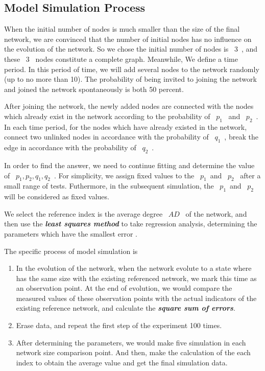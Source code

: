 \documentclass[a4paper,11pt]{article}
\begin{document}
\subsection{Model Simulation Process}
\par When the initial number of nodes is much smaller than the size of the final network, we are convinced that the number of initial nodes has no influence on the evolution of the network. So we chose the initial number of nodes is ~$3$~, and these ~$3$~ nodes constitute a complete graph. Meanwhile, We define a time period. In this period of time, we will add several nodes to the network randomly (up to no more than 10). The probability of being invited to joining the network and joined the network spontaneously is both 50 percent.
\par After joining the network, the newly added nodes are connected with the nodes which already exist in the network according to the probability of ~$p_1$~ and ~$p_2$~. In each time period, for the nodes which have already existed in the network, connect two unlinked nodes in accordance with the probability of ~$q_1$~, break the edge in accordance with the probability of ~$q_2$~.
\par In order to find the answer, we need to continue fitting and determine the value of ~$p_1, p_2, q_1, q_2$~. For simplicity, we assign fixed values to the ~$p_1$~and ~$p_2$~ after a small range of tests. Futhermore, in the subsequent simulation, the ~$p_1$~and ~$p_2$~ will be considered as fixed values.
\par We select the reference index is the average degree ~$AD$~ of the network, and then use the \textbf{\emph{least squares method}} to take regression analysis, determining the parameters which have the smallest error .
\par The specific process of model simulation is

\begin{enumerate}%
\renewcommand{\labelenumi}{(\theenumi)}
    \item In the evolution of the network, when the network evolute to a state where has the same size with the existing referenced network, we mark this time as an observation point. At the end of evolution, we would compare the measured values of these observation points with the actual indicators of the existing reference network, and calculate the \textbf{\emph{square sum of errors}}.
    \item Erase data, and repeat the first step of the experiment 100 times.
    \item After determining the parameters, we would make five simulation in each network size comparison point. And then, make the calculation of the each index to obtain the average value and get the final simulation data.
\end{enumerate}
\end{document}
